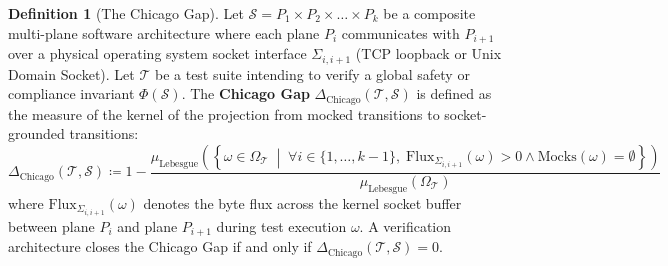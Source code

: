 \documentclass[10pt,twoside,openany]{book}
\theoremstyle{plain}
\theoremstyle{definition}
\newtheorem{definition}[theorem]{Definition}
\theoremstyle{remark}
\begin{document}
\begin{definition}[The Chicago Gap]
Let $\mathcal{S} = P_1 \times P_2 \times \dots \times P_k$ be a composite multi-plane software architecture where each plane $P_i$ communicates with $P_{i+1}$ over a physical operating system socket interface $\Sigma_{i,i+1}$ (TCP loopback or Unix Domain Socket). Let $\mathcal{T}$ be a test suite intending to verify a global safety or compliance invariant $\Phi(\mathcal{S})$. The \textbf{Chicago Gap} $\Delta_{\mathrm{Chicago}}(\mathcal{T}, \mathcal{S})$ is defined as the measure of the kernel of the projection from mocked transitions to socket-grounded transitions:
\begin{equation}
\Delta_{\mathrm{Chicago}}(\mathcal{T}, \mathcal{S}) \coloneqq 1 - \frac{\mu_{\mathrm{Lebesgue}}\!\left(\left\{ \omega \in \Omega_{\mathcal{T}} \;\middle|\; \forall i \in \{1,\dots,k-1\},\; \mathrm{Flux}_{\Sigma_{i,i+1}}(\omega) > 0 \land \mathrm{Mocks}(\omega) = \emptyset \right\}\right)}{\mu_{\mathrm{Lebesgue}}(\Omega_{\mathcal{T}})}
\end{equation}
where $\mathrm{Flux}_{\Sigma_{i,i+1}}(\omega)$ denotes the byte flux across the kernel socket buffer between plane $P_i$ and plane $P_{i+1}$ during test execution $\omega$. A verification architecture closes the Chicago Gap if and only if $\Delta_{\mathrm{Chicago}}(\mathcal{T}, \mathcal{S}) = 0$.
\end{definition}
\end{document}
